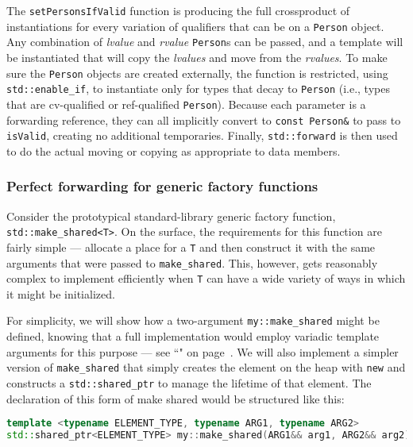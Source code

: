 \noindent The \texttt{setPersonsIfValid} function is producing the full crossproduct of instantiations for every variation of qualifiers that can be
on a \texttt{Person} object. Any combination of \emph{lvalue} and
\emph{rvalue} \texttt{Person}s can be passed, and a template will be
instantiated that will copy the \emph{lvalues} and move from the
\emph{rvalues}. To make sure the \texttt{Person} objects are
created externally, the function is restricted, using
\texttt{std::enable\_if}, to instantiate only for types that decay to
\texttt{Person} (i.e., types that are cv-qualified or ref-qualified
\texttt{Person}). Because each parameter is a forwarding reference, they
can all implicitly convert to \texttt{const}~\texttt{Person\&} to pass
to \texttt{isValid}, creating no additional temporaries. Finally,
\texttt{std::forward} is then used to do the actual moving or copying as
appropriate to data members.

\subsubsection[Perfect forwarding for generic factory functions]{Perfect forwarding for generic factory functions}\label{perfect-forwarding-for-generic-factory-functions}

Consider the prototypical standard-library generic factory function,
\texttt{std::make\_shared<T>}. On the surface, the requirements for this
function are fairly simple --- allocate a place for a \texttt{T} and
then construct it with the same arguments that were passed to
\texttt{make\_shared}. This, however, gets reasonably complex to
implement efficiently when \texttt{T} can have a wide variety of ways in
which it might be initialized.

For simplicity, we will show how a two-argument \texttt{my::make\_shared}
might be defined, knowing that a full implementation would employ
variadic template arguments for this purpose --- see ``" on page~\pageref{variable-templates}. We will also implement a simpler
version of \texttt{make\_shared} that simply creates the element on the
heap with \texttt{new} and constructs a \texttt{std::shared\_ptr} to
manage the lifetime of that element. The declaration of this form of
make shared would be structured like this:

\begin{lstlisting}[language=C++]
template <typename ELEMENT_TYPE, typename ARG1, typename ARG2>
std::shared_ptr<ELEMENT_TYPE> my::make_shared(ARG1&& arg1, ARG2&& arg2)
\end{lstlisting}

